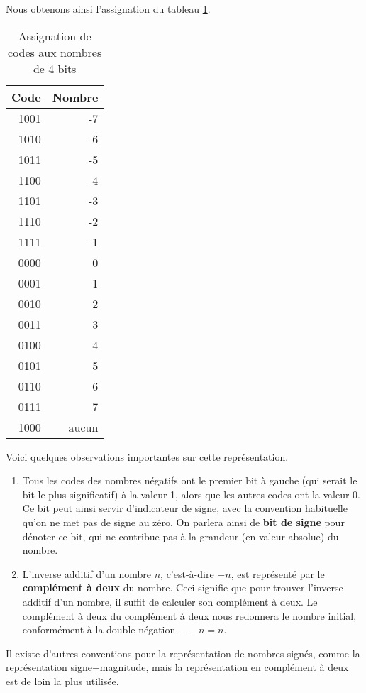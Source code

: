 \documentclass[11pt]{article}
\begin{document}
Nous obtenons ainsi l'assignation du tableau \ref{tab:orgbc8c7d4}.

\begin{table}[htbp]
\caption{\label{tab:orgbc8c7d4}Assignation de codes aux nombres de 4 bits}
\centering
\begin{tabular}{rr}
Code & Nombre\\[0pt]
\hline
1001 & -7\\[0pt]
1010 & -6\\[0pt]
1011 & -5\\[0pt]
1100 & -4\\[0pt]
1101 & -3\\[0pt]
1110 & -2\\[0pt]
1111 & -1\\[0pt]
0000 & 0\\[0pt]
0001 & 1\\[0pt]
0010 & 2\\[0pt]
0011 & 3\\[0pt]
0100 & 4\\[0pt]
0101 & 5\\[0pt]
0110 & 6\\[0pt]
0111 & 7\\[0pt]
1000 & aucun\\[0pt]
\end{tabular}
\end{table}

Voici quelques observations importantes sur cette représentation.

\begin{enumerate}
\item Tous les codes des nombres négatifs ont le premier bit à gauche
(qui serait le bit le plus significatif) à la valeur 1, alors que
les autres codes ont la valeur 0. Ce bit peut ainsi servir
d'indicateur de signe, avec la convention habituelle qu'on ne met
pas de signe au zéro. On parlera ainsi de \textbf{bit de signe} pour
dénoter ce bit, qui ne contribue pas à la grandeur (en valeur
absolue) du nombre.

\item L'inverse additif d'un nombre \(n\), c'est-à-dire \(-n\), est
représenté par le \textbf{complément à deux} du nombre. Ceci signifie que
pour trouver l'inverse additif d'un nombre, il suffit de calculer
son complément à deux. Le complément à deux du complément à deux nous
redonnera le nombre initial, conformément à la double négation
\(--n = n\).
\end{enumerate}

Il existe d'autres conventions pour la représentation de nombres
signés, comme la représentation signe+magnitude, mais la
représentation en complément à deux est de loin la plus utilisée.
\end{document}
